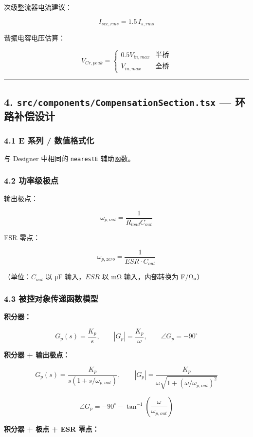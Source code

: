 \documentclass[UTF8]{ctexart}
\begin{document}
次级整流器电流建议：

\[
I_{sec,rms} = 1.5 \, I_{s,rms}
\]

谐振电容电压估算：

\[
V_{Cr,peak} = \begin{cases} 0.5 V_{in,max} & \text{半桥} \\ V_{in,max} & \text{全桥} \end{cases}
\]

\noindent\rule{\textwidth}{0.4pt}

\subsection*{4. \texttt{src/components/CompensationSection.tsx} — 环路补偿设计}

\subsubsection*{4.1 E 系列 / 数值格式化}

与 Designer 中相同的 \texttt{nearestE} 辅助函数。

\subsubsection*{4.2 功率级极点}

输出极点：

\[
\omega_{p,out} = \frac{1}{R_{load} C_{out}}
\]

ESR 零点：

\[
\omega_{p,zero} = \frac{1}{ESR \cdot C_{out}}
\]

（单位：\(C_{out}\) 以 μF 输入，\(ESR\) 以 mΩ 输入，内部转换为 F/Ω。）

\subsubsection*{4.3 被控对象传递函数模型}

\textbf{积分器：}

\[
G_p(s) = \frac{K_p}{s},\qquad |G_p| = \frac{K_p}{\omega},\qquad \angle G_p = -90^{\circ}
\]

\textbf{积分器 + 输出极点：}

\[
G_p(s) = \frac{K_p}{s(1 + s/\omega_{p,out})},\qquad
|G_p| = \frac{K_p}{\omega \sqrt{1 + (\omega/\omega_{p,out})^{2}}}
\]

\[
\angle G_p = -90^{\circ} - \tan^{-1}\left(\frac{\omega}{\omega_{p,out}}\right)
\]

\textbf{积分器 + 极点 + ESR 零点：}
\end{document}
